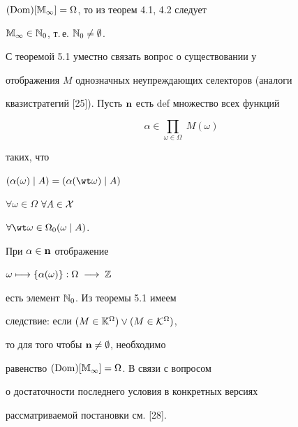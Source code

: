 ${(\operatorname{Dom})[{\Bbb M}_\infty]} = \Omega$, то из теорем 4.1, 4.2 следует


${{\Bbb M}_\infty} \in {{\Bbb N}_0}$, т.\,е. ${{\Bbb N}_0} \ne


\emptyset$.





С теоремой 5.1 уместно связать вопрос о существовании у


отображения $M$ однозначных неупреждающих селекторов (аналоги


квазистратегий [25]). Пусть ${\bold n}$ есть def множество всех функций


$$


\alpha \in \prod_{\omega \in \Omega}\;{M(\omega)}


$$


таких, что


${({\alpha}(\omega) \mid A)} = {({\alpha}(\wt \omega) \mid A)}$


$\forall{\omega} \in \Omega$ $\forall{A} \in {\cal X}$


$\forall{\wt \omega} \in {{{\Omega}_0}(\omega \mid A)}$.


При ${\alpha} \in {\bold n}$ отображение


$\omega \longmapsto \{{\alpha}(\omega)\}:\Omega\;\longrightarrow\;{\Bbb Z}$


есть элемент ${\Bbb N}_0$. Из теоремы 5.1 имеем


следствие: если $(M \in {{\Bbb K}^\Omega}) \vee (M \in {{\cal K}^\Omega})$,


то для того чтобы ${\bold n} \ne \emptyset$, необходимо


равенство ${(\operatorname{Dom})[{\Bbb M}_\infty]} = \Omega$. В связи с вопросом


о достаточности последнего условия в конкретных версиях


рассматриваемой постановки см. [28].





